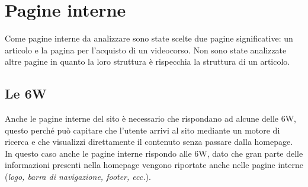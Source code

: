 \section{Pagine interne}
Come pagine interne da analizzare sono state scelte due pagine significative: un articolo e la pagina per l'acquisto di un videocorso.
Non sono state analizzate altre pagine in quanto la loro struttura è rispecchia la struttura di un articolo.

\subsection{Le 6W}
Anche le pagine interne del sito è necessario che rispondano ad alcune delle 6W, questo perché può capitare che l'utente arrivi al sito mediante un motore di ricerca e che visualizzi direttamente il contenuto senza passare dalla homepage.\\
In questo caso anche le pagine interne rispondo alle 6W, dato che gran parte delle informazioni presenti nella homepage vengono riportate anche nelle pagine interne (\textit{logo, barra di navigazione, footer, ecc.}).


